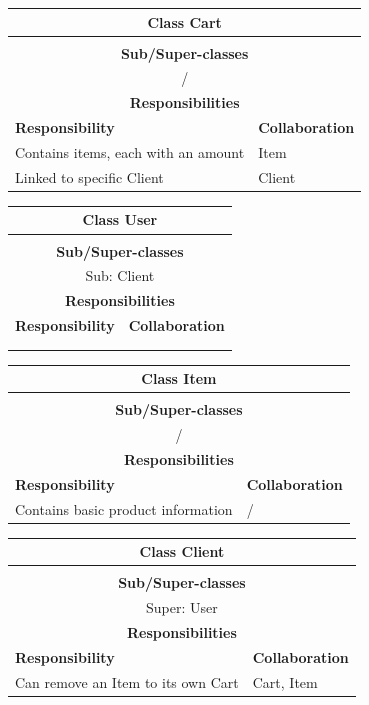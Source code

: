\documentclass[•]{article}
\begin{document}
\begin{table}
\begin{tabular}{|l||l|}
\hline
\multicolumn{2}{|c|}{ Class \textbf{Cart} }\\ \hline
\multicolumn{2}{|c|}{}\\ \hline
\multicolumn{2}{|c|}{ \textbf{Sub/Super-classes} }\\ \hline
\multicolumn{2}{|c|}{/} \\ \hline
\multicolumn{2}{|c|}{ \textbf{Responsibilities}}\\ \hline
\textbf{Responsibility} & \textbf{Collaboration} \\ \hline
Contains items, each with an amount & Item \\ \hline
Linked to specific Client & Client \\ \hline
\end{tabular}
\begin{tabular}{|l||l|}
\hline
\multicolumn{2}{|c|}{ Class \textbf{User} }\\ \hline
\multicolumn{2}{|c|}{}\\ \hline
\multicolumn{2}{|c|}{ \textbf{Sub/Super-classes} }\\ \hline
\multicolumn{2}{|c|}{Sub: Client} \\ \hline
\multicolumn{2}{|c|}{ \textbf{Responsibilities}}\\ \hline
\textbf{Responsibility} & \textbf{Collaboration} \\ \hline
 &  \\ 
 &  \\
 \hline
\end{tabular}

\begin{tabular}{|l||l|}
\hline
\multicolumn{2}{|c|}{ Class \textbf{Item} }\\ \hline
\multicolumn{2}{|c|}{}\\ \hline
\multicolumn{2}{|c|}{ \textbf{Sub/Super-classes} }\\ \hline
\multicolumn{2}{|c|}{/} \\ \hline
\multicolumn{2}{|c|}{ \textbf{Responsibilities}}\\ \hline
\textbf{Responsibility} & \textbf{Collaboration} \\ \hline
Contains basic product information & / \\ \hline
\end{tabular}
\begin{tabular}{|l||l|}
\hline
\multicolumn{2}{|c|}{ Class \textbf{Client} }\\ \hline
\multicolumn{2}{|c|}{}\\ \hline
\multicolumn{2}{|c|}{ \textbf{Sub/Super-classes} }\\ \hline
\multicolumn{2}{|c|}{Super: User} \\ \hline
\multicolumn{2}{|c|}{ \textbf{Responsibilities}}\\ \hline
\textbf{Responsibility} & \textbf{Collaboration} \\ \hline
Can remove an Item to its own Cart & Cart, Item  \\ \hline
\end{tabular}


\end{table}
\end{document}
